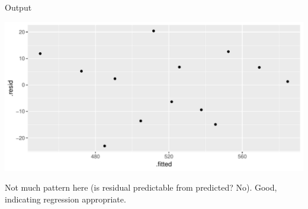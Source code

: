 \begin{frame}[fragile]{Output}

 
\begin{knitrout}
\color{fgcolor}\begin{kframe}
\begin{alltt}
\hlstd{(}\hlopt{+}\hlstd{()}
\end{alltt}
\end{kframe}
\includegraphics[width=\maxwidth]{figure/akjhkadjfhjahnkkk-1} 

\end{knitrout}
  

Not much pattern here (is residual predictable from predicted? No). Good, indicating regression appropriate.
  
\end{frame}


